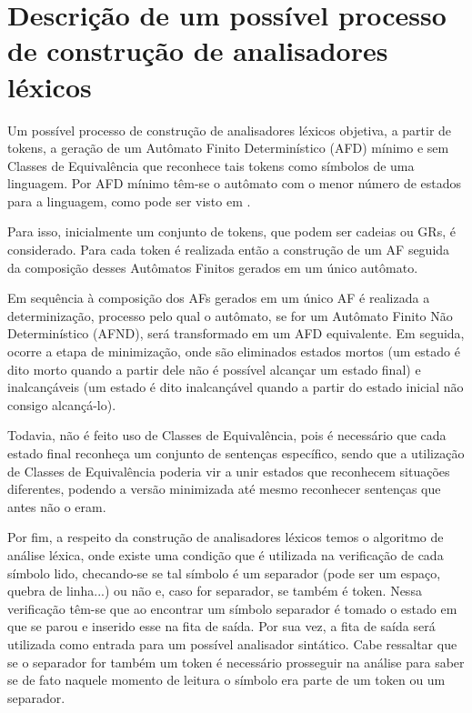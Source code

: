 \documentclass[12pt]{article}
\begin{document}
\section{Descrição de um possível processo de construção de analisadores léxicos}
\label{2}

Um possível processo de construção de analisadores léxicos objetiva, a partir de tokens, a geração de um Autômato Finito Determinístico (AFD) mínimo e sem Classes de Equivalência que reconhece tais tokens como símbolos de uma linguagem. Por AFD mínimo têm-se o autômato com o menor número de estados para a linguagem, como pode ser visto em \cite[p.~72]{menezes:00}.

Para isso, inicialmente um conjunto de tokens, que podem ser cadeias ou GRs, é considerado. Para cada token é realizada então a construção de um AF seguida da composição desses Autômatos Finitos gerados em um único autômato. 

Em sequência à composição dos AFs gerados em um único AF é realizada a determinização, processo pelo qual o autômato, se for um Autômato Finito Não Determinístico (AFND), será transformado em um AFD equivalente. Em seguida, ocorre a etapa de minimização, onde são eliminados estados mortos (um estado é dito morto quando a partir dele não é possível alcançar um estado final) e inalcançáveis (um estado é dito inalcançável quando a partir do estado inicial não consigo alcançá-lo).

Todavia, não é feito uso de Classes de Equivalência, pois é necessário que cada estado final reconheça um conjunto de sentenças específico, sendo que a utilização de Classes de Equivalência poderia vir a unir estados que reconhecem situações diferentes, podendo a versão minimizada até mesmo reconhecer sentenças que antes não o eram.

Por fim, a respeito da construção de analisadores léxicos temos o algoritmo de análise léxica, onde existe uma condição que é utilizada na verificação de cada símbolo lido, checando-se se tal símbolo é um separador (pode ser um espaço, quebra de linha...) ou não e, caso for separador, se também é token. Nessa verificação têm-se que ao encontrar um símbolo separador é tomado o estado em que se parou e inserido esse na fita de saída. Por sua vez, a fita de saída será utilizada como entrada para um possível analisador sintático. Cabe ressaltar que se o separador for também um token é necessário prosseguir na análise para saber se de fato naquele momento de leitura o símbolo era parte de um token ou um separador.
\end{document}

